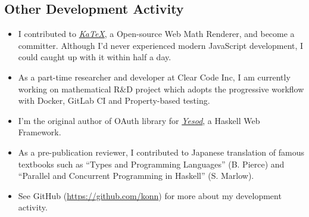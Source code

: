 \documentclass[letterpaper]{scrartcl}
\begin{document}
 \subsection*{Other Development Activity}
 \begin{itemize}
 \item I contributed to \emph{\href{https://khan.github.io/KaTeX/}{\emph{KaTeX}}}, a Open-source Web Math Renderer, and become a committer.
       Although I'd never experienced modern JavaScript development, I could caught up with it within half a day.
 \item As a part-time researcher and developer at Clear Code Inc, I am currently working on mathematical R\&D project which adopts the progressive workflow with Docker, GitLab CI and Property-based testing.
 \item I'm the original author of OAuth library for \emph{\href{https://www.yesodweb.com}{Yesod}}, a Haskell Web Framework.
 \item As a pre-publication reviewer, I contributed to Japanese translation of famous textbooks such as ``Types and Programming Languages'' (B. Pierce) and ``Parallel and Concurrent Programming in Haskell'' (S. Marlow).
 \item See GitHub (\url{https://github.com/konn}) for more about my development activity.
 \end{itemize}
\end{document}
